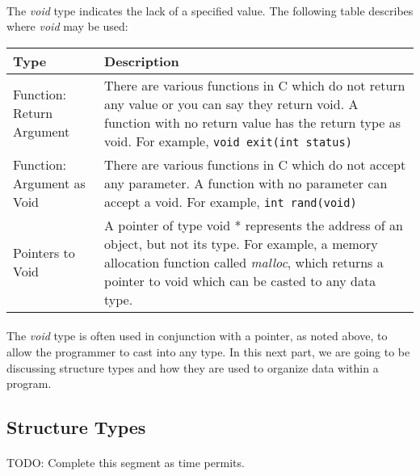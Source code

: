    \paragraph{}
      The \textit{void} type indicates the lack of a specified value. The following table describes where \textit{void} may be used:
      \begin{center}
         \begin{tabular}{ || p{2in} | p{4in} || }
         \hline
         \textbf{Type} & \textbf{Description} \\ [1ex]
         \hline\hline
         Function: Return Argument & There are various functions in C which do not return any value or you can say they return void. A function with
         no return value has the return type as void. For example, \verb;void exit(int status); \\ [0.4ex]
         \hline
         Function: Argument as Void & There are various functions in C which do not accept any parameter. A function with no parameter can accept a
         void. For example, \verb;int rand(void); \\ [0.6ex]
         \hline
         Pointers to Void & A pointer of type void * represents the address of an object, but not its type. For example, a memory allocation function 
         called \textit{malloc}, which returns a pointer to void which can be casted to any data type. \\ [0.4ex]
         \hline
         \end{tabular}
      \end{center}

   \paragraph{}
      The \textit{void} type is often used in conjunction with a pointer, as noted above, to allow the programmer to cast into any type.
      In this next part, we are going to be discussing structure types and how they are used to organize data within a program.

\newpage

\subsection{Structure Types}
   \paragraph{}
      TODO: Complete this segment as time permits.

